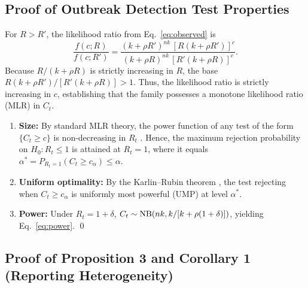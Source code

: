 \subsection{Proof of Outbreak Detection Test Properties}
\label{sec:proof-test}

For $R > R'$, the likelihood ratio from Eq.~\eqref{eq:observed} is
\begin{equation}
  \frac{f(c; R)}{f(c; R')} = \frac{(k+\rho R')^{nk}\,[R(k+\rho R')]^{c}}{(k+\rho R)^{nk}\,[R'(k+\rho R)]^{c}}.
\end{equation}
Because $R/(k+\rho R)$ is strictly increasing in $R$, the base $R(k+\rho R')/[R'(k+\rho R)] > 1$. Thus, the likelihood ratio is strictly increasing in $c$, establishing that the family possesses a monotone likelihood ratio (MLR) in $C_t$.

\begin{enumerate}[label=(\alph*)]
  \item \textbf{Size:} By standard MLR theory, the power function of any test of the form $\{C_t \ge c\}$ is non-decreasing in $R_t$ \citep{lehmann2005testing}. Hence, the maximum rejection probability on $H_0\colon R_t \le 1$ is attained at $R_t = 1$, where it equals $\alpha^* = P_{R_t=1}(C_t \ge c_\alpha) \le \alpha$.
  \item \textbf{Uniform optimality:} By the Karlin--Rubin theorem \citep{karlin1956theory}, the test rejecting when $C_t \ge c_\alpha$ is uniformly most powerful (UMP) at level $\alpha^*$.
  \item \textbf{Power:} Under $R_t = 1 + \delta$, $C_t \sim \mathrm{NB}(nk, k/[k+\rho(1+\delta)])$, yielding Eq.~\eqref{eq:power}. \qed
\end{enumerate}

\subsection{Proof of Proposition 3 and Corollary 1 (Reporting Heterogeneity)}
\label{sec:proof-prop3}

